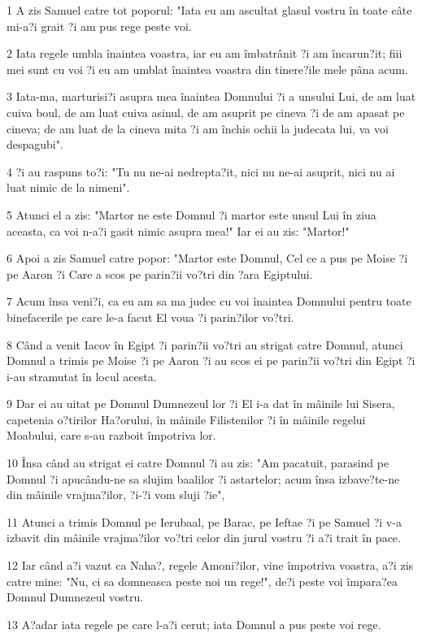 \par 1 A zis Samuel catre tot poporul: "Iata eu am ascultat glasul vostru în toate câte mi-a?i grait ?i am pus rege peste voi.
\par 2 Iata regele umbla înaintea voastra, iar eu am îmbatrânit ?i am încarun?it; fiii mei sunt cu voi ?i eu am umblat înaintea voastra din tinere?ile mele pâna acum.
\par 3 Iata-ma, marturisi?i asupra mea înaintea Domnului ?i a unsului Lui, de am luat cuiva boul, de am luat cuiva asinul, de am asuprit pe cineva ?i de am apasat pe cineva; de am luat de la cineva mita ?i am închis ochii la judecata lui, va voi despagubi".
\par 4 ?i au raspuns to?i: "Tu nu ne-ai nedrepta?it, nici nu ne-ai asuprit, nici nu ai luat nimic de la nimeni".
\par 5 Atunci el a zis: "Martor ne este Domnul ?i martor este unsul Lui în ziua aceasta, ca voi n-a?i gasit nimic asupra mea!" Iar ei au zis: "Martor!"
\par 6 Apoi a zis Samuel catre popor: "Martor este Domnul, Cel ce a pus pe Moise ?i pe Aaron ?i Care a scos pe parin?ii vo?tri din ?ara Egiptului.
\par 7 Acum însa veni?i, ca eu am sa ma judec cu voi înaintea Domnului pentru toate binefacerile pe care le-a facut El voua ?i parin?ilor vo?tri.
\par 8 Când a venit Iacov în Egipt ?i parin?ii vo?tri au strigat catre Domnul, atunci Domnul a trimis pe Moise ?i pe Aaron ?i au scos ei pe parin?ii vo?tri din Egipt ?i i-au stramutat în locul acesta.
\par 9 Dar ei au uitat pe Domnul Dumnezeul lor ?i El i-a dat în mâinile lui Sisera, capetenia o?tirilor Ha?orului, în mâinile Filistenilor ?i în mâinile regelui Moabului, care s-au razboit împotriva lor.
\par 10 Însa când au strigat ei catre Domnul ?i au zis: "Am pacatuit, parasind pe Domnul ?i apucându-ne sa slujim baalilor ?i astartelor; acum însa izbave?te-ne din mâinile vrajma?ilor, ?i-?i vom sluji ?ie",
\par 11 Atunci a trimis Domnul pe Ierubaal, pe Barac, pe Ieftae ?i pe Samuel ?i v-a izbavit din mâinile vrajma?ilor vo?tri celor din jurul vostru ?i a?i trait în pace.
\par 12 Iar când a?i vazut ca Naha?, regele Amoni?ilor, vine împotriva voastra, a?i zis catre mine: "Nu, ci sa domneasca peste noi un rege!", de?i peste voi împara?ea Domnul Dumnezeul vostru.
\par 13 A?adar iata regele pe care l-a?i cerut; iata Domnul a pus peste voi rege.
